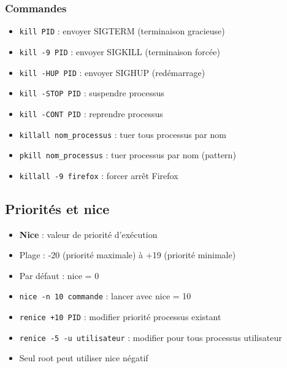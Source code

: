 \documentclass[12pt,a4paper]{article}
\begin{document}
\subsubsection{Commandes}
\begin{itemize}
    \item \texttt{kill PID} : envoyer SIGTERM (terminaison gracieuse) %
    \item \texttt{kill -9 PID} : envoyer SIGKILL (terminaison forc\'ee) %
    \item \texttt{kill -HUP PID} : envoyer SIGHUP (red\'emarrage) %
    \item \texttt{kill -STOP PID} : suspendre processus %
    \item \texttt{kill -CONT PID} : reprendre processus %
    \item \texttt{killall nom\_processus} : tuer tous processus par nom %
    \item \texttt{pkill nom\_processus} : tuer processus par nom (pattern) %
    \item \texttt{killall -9 firefox} : forcer arr\^et Firefox %
\end{itemize}


\subsection{Priorit\'es et nice}
\begin{itemize}
    \item \textbf{Nice} : valeur de priorit\'e d'ex\'ecution %
    \item Plage : -20 (priorit\'e maximale) \`a +19 (priorit\'e minimale) %
    \item Par d\'efaut : nice = 0 %
    \item \texttt{nice -n 10 commande} : lancer avec nice = 10 %
    \item \texttt{renice +10 PID} : modifier priorit\'e processus existant %
    \item \texttt{renice -5 -u utilisateur} : modifier pour tous processus utilisateur %
    \item Seul root peut utiliser nice n\'egatif %
\end{itemize}
\end{document}
